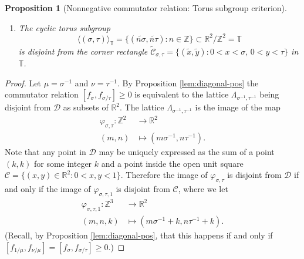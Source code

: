 \documentclass[11pt, letterpaper, reqno]{amsart}
\newtheorem{prop}[thm]{Proposition}
\theoremstyle{definition}
\numberwithin{equation}{section}
\newcommand{\RR}{\ensuremath{\mathbb{R}}}
\newcommand{\ZZ}{\ensuremath{\mathbb{Z}}}
\newcommand{\TT}{\mathbb{T}}
\newcommand{\cC}{\mathcal{C}}
\newcommand{\cCbar}{\widetilde{\mathcal{C}}}
\newcommand{\um}{{\mu}}
\newcommand{\vm}{{\nu}}
\newcommand{\cD}{\mathcal{D}}
\newcommand{\talpha}{{\sigma}}
\newcommand{\trho}{{\tau}}
\begin{document}
{\begin{prop}[Nonnegative commutator relation: Torus subgroup criterion]
\begin{enumerate}
\item[(Q2)] The cyclic torus subgroup 
\[
\langle (\talpha, \trho) \rangle_{\TT} = {\{ (\widetilde{n\talpha}, \widetilde{n\trho})  : n\in \ZZ \}}  \subset \RR^2 /\ZZ^2 = \TT
\]
is disjoint from the  corner rectangle 
$\cCbar_{\talpha,\trho}= \{(\widetilde{x},\widetilde{y}) : 0<x<\talpha, \, 0<y<\trho \}$
in  $\TT$.
\end{enumerate}
\end{prop}

\begin{proof}
Let $\um = \talpha^{-1}$ and $ \vm = \trho^{-1}$.
By Proposition \ref{lem:diagonal-pos} the commutator relation $[f_{\talpha}, f_{\talpha/\trho}] \geq 0$ 
is equivalent to the lattice $\Lambda_{\talpha^{-1},\trho^{-1}}$ 
being disjoint from $\cD$ as subsets of $\RR^2$.
The lattice $\Lambda_{\talpha^{-1},\trho^{-1}}$ is the image of the map 
\begin{align*}
\varphi_{\talpha,\trho} : \ZZ^2 &\to \RR^2 \\
(m,n) &\mapsto (m\talpha^{-1}, n\trho^{-1} ) .
\end{align*}
Note that any point in $\cD$ 
may be uniquely expressed as the sum of a point $(k,k)$ for some integer $k$
and a point inside the open unit square 
$ \cC = {\{ (x,y)\in \RR^2 : 0 < x,y < 1\}} $.
Therefore the image of $\varphi_{\talpha,\trho}$ is disjoint from $\cD$ if and only if the image of 
$\varphi_{\talpha,\trho,1}$ is disjoint from $\cC$,
where we let
\begin{align*}
\varphi_{\talpha,\trho,1} : \ZZ^3 &\to \RR^2  \\
(m,n,k) &\mapsto (m\talpha^{-1} + k, n\trho^{-1} + k) .
\end{align*}
(Recall, by Proposition \ref{lem:diagonal-pos}, that this happens if and only if 
$[f_{1/\um}, f_{\vm/\um}] = [f_\talpha, f_{\talpha/\trho}] \geq 0$.)


\end{proof}}
\end{document}
